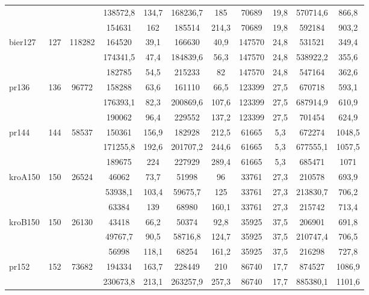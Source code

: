 \begin{adjustwidth}{-1in}{-1in}
\begin{center}
\begin{tabular}{lcccccccccc}
 & &  & 138572,8 & 134,7  & 168236,7 & 185  & 70689 & 19,8  & 570714,6 & 866,8 \\
 & &  & 154631 & 162  & 185514 & 214,3  & 70689 & 19,8  & 592184 & 903,2 \\
\midrule
\multirow{3}{*}{bier127} & \multirow{3}{*}{127} & \multirow{3}{*}{118282} & 164520 & 39,1  & 166630 & 40,9  & 147570 & 24,8  & 531521 & 349,4 \\
 & &  & 174341,5 & 47,4  & 184839,6 & 56,3  & 147570 & 24,8  & 538922,2 & 355,6 \\
 & &  & 182785 & 54,5  & 215233 & 82  & 147570 & 24,8  & 547164 & 362,6 \\
\midrule
\multirow{3}{*}{pr136} & \multirow{3}{*}{136} & \multirow{3}{*}{96772} & 158288 & 63,6  & 161110 & 66,5  & 123399 & 27,5  & 670718 & 593,1 \\
 & &  & 176393,1 & 82,3  & 200869,6 & 107,6  & 123399 & 27,5  & 687914,9 & 610,9 \\
 & &  & 190062 & 96,4  & 229552 & 137,2  & 123399 & 27,5  & 701454 & 624,9 \\
\midrule
\multirow{3}{*}{pr144} & \multirow{3}{*}{144} & \multirow{3}{*}{58537} & 150361 & 156,9  & 182928 & 212,5  & 61665 & 5,3  & 672274 & 1048,5 \\
 & &  & 171255,8 & 192,6  & 201707,2 & 244,6  & 61665 & 5,3  & 677555,1 & 1057,5 \\
 & &  & 189675 & 224  & 227929 & 289,4  & 61665 & 5,3  & 685471 & 1071 \\
\midrule
\multirow{3}{*}{kroA150} & \multirow{3}{*}{150} & \multirow{3}{*}{26524} & 46062 & 73,7  & 51998 & 96  & 33761 & 27,3  & 210578 & 693,9 \\
 & &  & 53938,1 & 103,4  & 59675,7 & 125  & 33761 & 27,3  & 213830,7 & 706,2 \\
 & &  & 63384 & 139  & 68980 & 160,1  & 33761 & 27,3  & 215742 & 713,4 \\
\midrule
\multirow{3}{*}{kroB150} & \multirow{3}{*}{150} & \multirow{3}{*}{26130} & 43418 & 66,2  & 50374 & 92,8  & 35925 & 37,5  & 206901 & 691,8 \\
 & &  & 49767,7 & 90,5  & 58716,8 & 124,7  & 35925 & 37,5  & 210747,4 & 706,5 \\
 & &  & 56998 & 118,1  & 68254 & 161,2  & 35925 & 37,5  & 216298 & 727,8 \\
\midrule
\multirow{3}{*}{pr152} & \multirow{3}{*}{152} & \multirow{3}{*}{73682} & 194334 & 163,7  & 228449 & 210  & 86740 & 17,7  & 874527 & 1086,9 \\
 & &  & 230673,8 & 213,1  & 263257,9 & 257,3  & 86740 & 17,7  & 885380,1 & 1101,6 \\

\end{tabular}
\end{center}
\end{adjustwidth}
